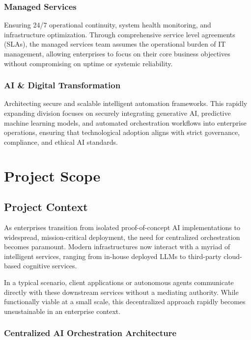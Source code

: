 \subsubsection{Managed Services}

Ensuring 24/7 operational continuity, system health monitoring, and infrastructure optimization. Through comprehensive service level agreements (SLAs), the managed services team assumes the operational burden of IT management, allowing enterprises to focus on their core business objectives without compromising on uptime or systemic reliability.

\subsubsection{AI \& Digital Transformation}

Architecting secure and scalable intelligent automation frameworks. This rapidly expanding division focuses on securely integrating generative AI, predictive machine learning models, and automated orchestration workflows into enterprise operations, ensuring that technological adoption aligns with strict governance, compliance, and ethical AI standards.

\section{Project Scope}

\subsection{Project Context}

As enterprises transition from isolated proof-of-concept AI implementations to widespread, mission-critical deployment, the need for centralized orchestration becomes paramount. Modern infrastructures now interact with a myriad of intelligent services, ranging from in-house deployed LLMs to third-party cloud-based cognitive services.

In a typical scenario, client applications or autonomous agents communicate directly with these downstream services without a mediating authority. While functionally viable at a small scale, this decentralized approach rapidly becomes unsustainable in an enterprise context.

\subsubsection{Centralized AI Orchestration Architecture}

